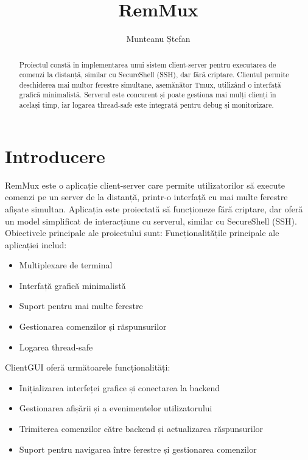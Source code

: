 \documentclass[runningheads]{llncs}
\begin{document}
\title{RemMux}
\author{Munteanu Ștefan}
\maketitle

\begin{abstract}
Proiectul constă în implementarea unui sistem client-server pentru executarea de comenzi la distanță, similar cu SecureShell (SSH), dar fără criptare. Clientul permite deschiderea mai multor ferestre simultane, asemănător Tmux, utilizând o interfață grafică minimalistă. Serverul este concurent și poate gestiona mai mulți clienți în același timp, iar logarea thread-safe este integrată pentru debug și monitorizare.
\end{abstract}

\section{Introducere}
RemMux este o aplicație client-server care permite utilizatorilor să execute comenzi pe un server de la distanță, printr-o interfață cu mai multe ferestre afișate simultan. Aplicația este proiectată să funcționeze fără criptare, dar oferă un model simplificat de interacțiune cu serverul, similar cu SecureShell (SSH). Obiectivele principale ale proiectului sunt:
Funcționalitățile principale ale aplicației includ:
\begin{itemize}
    \item Multiplexare de terminal
    \item Interfață grafică minimalistă
    \item Suport pentru mai multe ferestre
    \item Gestionarea comenzilor și răspunsurilor
    \item Logarea thread-safe
\end{itemize}

ClientGUI oferă următoarele funcționalități:
\begin{itemize}
    \item Inițializarea interfeței grafice și conectarea la backend
    \item Gestionarea afișării și a evenimentelor utilizatorului
    \item Trimiterea comenzilor către backend și actualizarea răspunsurilor
    \item Suport pentru navigarea între ferestre și gestionarea comenzilor
\end{itemize}
\end{document}
